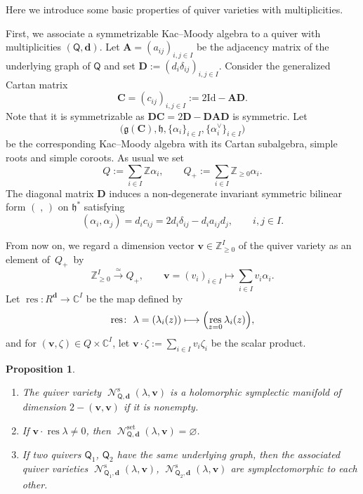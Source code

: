 \documentclass[pdftex]{sigma}
\numberwithin{equation}{section}
\newtheorem{Proposition}[Theorem]{Proposition}
\theoremstyle{definition}
\newcommand{\Z}{\mathbb{Z}} %
\newcommand{\C}{\mathbb{C}} %
\newcommand{\g}{\mathfrak{g}} %
\newcommand{\h}{\mathfrak{h}} %
\newcommand{\unit}{\mathrm{Id}}
\newcommand{\bA}{\mathbf{A}} %
\newcommand{\bD}{\mathbf{D}} %
\newcommand{\bC}{\mathbf{C}} %
\newcommand{\bv}{\mathbf{v}}
\newcommand{\res}{\operatorname*{res}}
\newcommand{\ved}{\mathbf{d}}
\newcommand{\Qst}{\operatorname{\mathscr{N}}^\mathrm{s}}
\newcommand{\Qset}{\operatorname{\mathscr{N}}^\mathrm{set}}
\newcommand{\QQ}{\mathsf{Q}} %
\begin{document}
Here we introduce some basic properties of quiver varieties
with multiplicities.

First, we associate a symmetrizable Kac--Moody algebra
to a quiver with multiplicities $(\QQ,\ved)$.
Let $\bA=(a_{ij})_{i,j \in I}$ be the adjacency matrix of
the underlying graph of $\QQ$ and
set $\bD := (d_i\delta_{ij})_{i,j \in I}$.
Consider the generalized Cartan matrix
\[
\bC=(c_{ij})_{i,j \in I} := 2 \unit - \bA \bD.
\]
Note that it is symmetrizable as $\bD \bC = 2 \bD - \bD \bA \bD$
is symmetric.
Let
\[
\bigl( \g(\bC), \h, \{ \alpha_i \}_{i \in I}, \{ \alpha_i^\vee \}_{i \in I}
\bigr)
\]
be the corresponding Kac--Moody algebra
with its Cartan subalgebra, simple roots and simple coroots.
As usual we set
\[
Q := \sum_{i \in I} \Z \alpha_i, \qquad
Q_+ := \sum_{i \in I} \Z_{\geq 0} \alpha_i.
\]
The diagonal matrix $\bD$
induces a non-degenerate invariant symmetric bilinear form
$(\; , \,)$
on $\h^*$ satisfying
\[
( \alpha_i, \alpha_j) = d_i c_{ij}
= 2 d_i \delta_{ij} - d_i a_{ij} d_j,
\qquad  i,j \in I.
\]

From now on, we regard a dimension vector $\bv \in \Z_{\geq 0}^I$
of the quiver variety as an element of~$Q_+$~by
\[
\Z_{\geq 0}^I \xrightarrow{\simeq} Q_+,
\qquad \bv=(v_i)_{i \in I} \mapsto \sum_{i \in I} v_i \alpha_i.
\]
Let $\res \colon R^\ved \to \C^I$ be the map def\/ined by
\[
\res \colon \ \lambda=(\lambda_i(z)) \longmapsto
\Bigl( \res_{z=0} \lambda_i(z) \Bigr),
\]
and for $(\bv, \zeta) \in Q \times \C^I$,
let $\bv \cdot \zeta := \sum\limits_{i \in I} v_i \zeta_i$
be the scalar product.

\begin{Proposition}\label{prop:dim}\qquad
\begin{enumerate}\itemsep=0pt
\item[{\rm (i)}] The quiver variety $\Qst_{\QQ,\ved}(\lambda,\bv)$
is a holomorphic symplectic manifold of dimension
$2 -(\bv, \bv)$ if it is nonempty.

\item[{\rm (ii)}] If $\bv \cdot \res \lambda \neq 0$,
then $\Qset_{\QQ,\ved}(\lambda,\bv) = \varnothing$.

\item[{\rm (iii)}] If two quivers $\QQ_1$, $\QQ_2$ have the same underlying graph,
then the associated quiver varieties
$\Qst_{\QQ_1,\ved}(\lambda,\bv)$, $\Qst_{\QQ_2,\ved}(\lambda,\bv)$
are symplectomorphic to each other.
\end{enumerate}
\end{Proposition}
\end{document}
